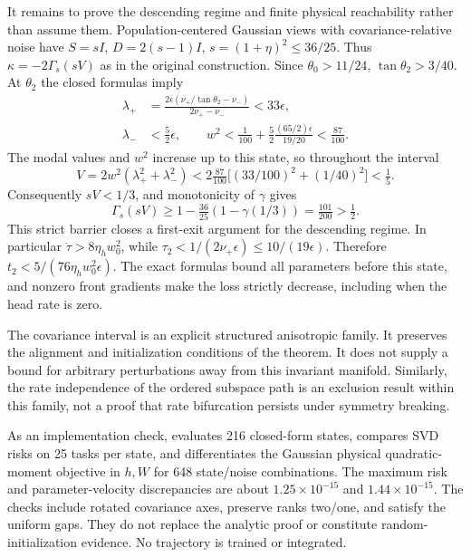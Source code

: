 It remains to prove the descending regime and finite physical reachability rather than assume them. Population-centered Gaussian views with covariance-relative noise have $S=sI$, $D=2(s-1)I$, $s=(1+\eta)^2\le36/25$. Thus $\kappa=-2\Gamma_s(sV)$ as in the original construction. Since $\theta_0>11/24$, $\tan\theta_2>3/40$. At $\theta_2$ the closed formulas imply
\begin{align}
 \lambda_+&=\frac{2\epsilon(\nu_+/\tan\theta_2-\nu_-)}{2\nu_+-\nu_-}<33\epsilon,\\
 \lambda_-&<\tfrac52\epsilon,\qquad
 w^2<\tfrac1{100}+\tfrac{5}{2}\frac{(65/2)\epsilon}{19/20}<\tfrac{87}{100}.
\end{align}
The modal values and $w^2$ increase up to this state, so throughout the interval
\begin{equation}
 V=2w^2(\lambda_+^2+\lambda_-^2)
 <2\tfrac{87}{100}\big[(33/100)^2+(1/40)^2\big]<\tfrac15.
\end{equation}
Consequently $sV<1/3$, and monotonicity of $\gamma$ gives
\begin{equation}
 \Gamma_s(sV)\ge1-\tfrac{36}{25}(1-\gamma(1/3))
 =\tfrac{101}{200}>\tfrac12.
\end{equation}
This strict barrier closes a first-exit argument for the descending regime. In particular $\dot\tau>8\eta_hw_0^2$, while $\tau_2<1/(2\nu_+\epsilon)\le10/(19\epsilon)$. Therefore $t_2<5/(76\eta_hw_0^2\epsilon)$. The exact formulas bound all parameters before this state, and nonzero front gradients make the loss strictly decrease, including when the head rate is zero.

The covariance interval is an explicit structured anisotropic family. It preserves the alignment and initialization conditions of the theorem. It does not supply a bound for arbitrary perturbations away from this invariant manifold. Similarly, the rate independence of the ordered subspace path is an exclusion result within this family, not a proof that rate bifurcation persists under symmetry breaking.

As an implementation check,  evaluates 216 closed-form states, compares SVD risks on 25 tasks per state, and differentiates the Gaussian physical quadratic-moment objective in $h,W$ for 648 state/noise combinations. The maximum risk and parameter-velocity discrepancies are about $1.25\times10^{-15}$ and $1.44\times10^{-15}$. The checks include rotated covariance axes, preserve ranks two/one, and satisfy the uniform gaps. They do not replace the analytic proof or constitute random-initialization evidence. No trajectory is trained or integrated.


